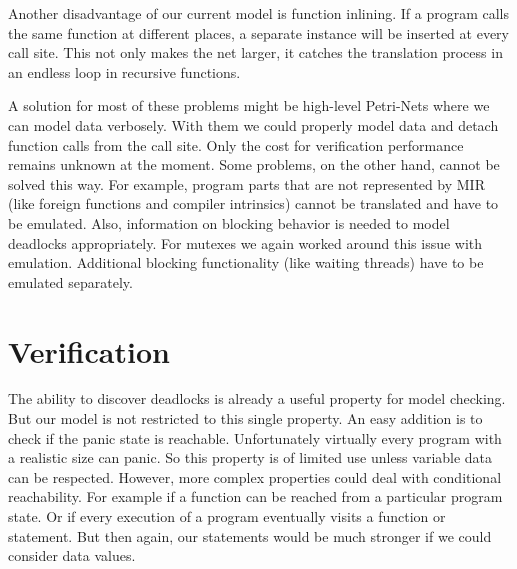 Another disadvantage of our current model is function inlining.
If a program calls the same function at different places, a separate instance will be inserted at every call site.
This not only makes the net larger, it catches the translation process in an endless loop in recursive functions.

A solution for most of these problems might be high-level Petri-Nets where we can model data verbosely.
With them we could properly model data and detach function calls from the call site.
Only the cost for verification performance remains unknown at the moment.
Some problems, on the other hand, cannot be solved this way.
For example, program parts that are not represented by MIR (like foreign functions and compiler intrinsics) cannot be translated and have to be emulated.
Also, information on blocking behavior is needed to model deadlocks appropriately.
For mutexes we again worked around this issue with emulation.
Additional blocking functionality (like waiting threads) have to be emulated separately.

\section{Verification}
The ability to discover deadlocks is already a useful property for model checking.
But our model is not restricted to this single property.
An easy addition is to check if the panic state is reachable.
Unfortunately virtually every program with a realistic size can panic.
So this property is of limited use unless variable data can be respected.
However, more complex properties could deal with conditional reachability.
For example if a function can be reached from a particular program state.
Or if every execution of a program eventually visits a function or statement.
But then again, our statements would be much stronger if we could consider data values.

